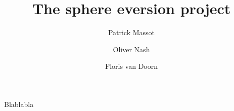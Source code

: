 \documentclass[a4paper]{report}
\title{The sphere eversion project}
\author{Patrick Massot \and Oliver Nash \and Floris van Doorn}
\begin{document}
\maketitle
Blablabla
%
\end{document}
